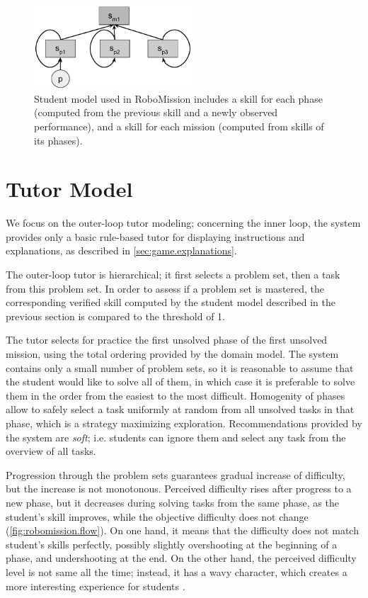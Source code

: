 \begin{figure}[htb]
\centering
\includegraphics[height=31mm]{img/robomission-student-model}
\caption{%
  Student model used in RoboMission includes a skill for each phase
  (computed from the previous skill and a newly observed performance),
  and a skill for each mission (computed from skills of its phases).}
\label{fig:robomission.student-model}
\end{figure}

\section{Tutor Model}
\label{robomission.tutor}

We focus on the outer-loop tutor modeling;
concerning the inner loop, the system provides only a basic
rule-based tutor for displaying instructions and explanations,
as described in \cref{sec:game.explanations}.

The outer-loop tutor is hierarchical;
it first selects a problem set, then a task from this problem set.
In order to assess if a problem set is mastered,
the corresponding verified skill
computed by the student model described in the previous section
is compared to the threshold of 1. %

The tutor selects for practice the first unsolved phase of the first
unsolved mission, using the total ordering provided by the domain model.
The system contains only a small number of problem sets,
so it is reasonable to assume that the student would like to solve all of
them,
in which case it is preferable to solve them in the order from the
easiest to the most difficult.
Homogenity of phases allow to safely select a task uniformly at random from
all unsolved tasks in that phase, which is a strategy maximizing exploration.
Recommendations provided by the system are \emph{soft};
i.e. students can ignore them and select any task
from the overview of all tasks.

Progression through the problem sets guarantees gradual increase of difficulty,
but the increase is not monotonous.
Perceived difficulty rises after progress to a new phase,
but it decreases during solving tasks from the same phase,
as the student's skill improves, while the objective difficulty does not change
(\cref{fig:robomission.flow}).
On one hand, it means that the difficulty does not match student's
skills perfectly, possibly slightly overshooting at the beginning of a phase,
and undershooting at the end.
On the other hand, the perceived difficulty level is not
same all the time; instead, it has a wavy character, which creates a more
interesting experience for students %
\cite{book-of-lenses}.

